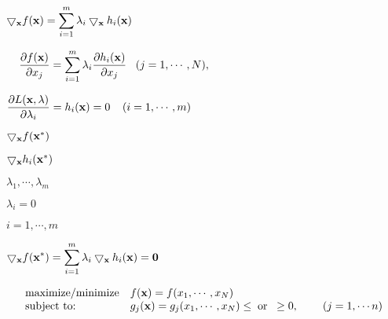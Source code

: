\documentclass{article}
\def\lthtmlcheckvsize{\ifdim\ht\sizebox<\vsize 
  \ifdim\wd\sizebox<\hsize\expandafter\hfill\fi \expandafter\vfill
  \else\expandafter\vss\fi}%
\begin{document}
{\newpage\clearpage
{}%
$\displaystyle \bigtriangledown_{\bf x} f({\bf x})
=\sum_{i=1}^m \lambda_i \bigtriangledown_{\bf x} h_i({\bf x})
\;\;\;\;$%
\lthtmlindisplaymathZ
\lthtmlcheckvsize\clearpage}

{\newpage\clearpage
{}%
$\displaystyle \;\;\;\;
\frac{\partial f({\bf x})}{\partial x_j}
=\sum_{i=1}^m\lambda_i \frac{\partial h_i({\bf x})}{\partial x_j}
\;\;\;(j=1,\cdots,N),$%
\lthtmlindisplaymathZ
\lthtmlcheckvsize\clearpage}

{\newpage\clearpage
{}%
$\displaystyle \frac{\partial L({\bf x},{\bf\lambda})}{\partial \lambda_i}
=h_i({\bf x})=0\;\;\;\;(i=1,\cdots,m)$%
\lthtmlindisplaymathZ
\lthtmlcheckvsize\clearpage}

{\newpage\clearpage
{}%
$ \bigtriangledown_{\bf x}f({\bf x}^*)$%
\lthtmlindisplaymathZ
\lthtmlcheckvsize\clearpage}

{\newpage\clearpage
{}%
$ \bigtriangledown_{\bf x} h_i({\bf x}^*)$%
\lthtmlindisplaymathZ
\lthtmlcheckvsize\clearpage}

{\newpage\clearpage
{}%
$ \lambda_1,\cdots,\lambda_m$%
\lthtmlindisplaymathZ
\lthtmlcheckvsize\clearpage}

{\newpage\clearpage
{}%
$ \lambda_i=0$%
\lthtmlindisplaymathZ
\lthtmlcheckvsize\clearpage}

{\newpage\clearpage
{}%
$ i=1,\cdots,m$%
\lthtmlindisplaymathZ
\lthtmlcheckvsize\clearpage}

{\newpage\clearpage
{}%
$\displaystyle \bigtriangledown_{\bf x} f({\bf x}^*)
=\sum_{i=1}^m \lambda_i \bigtriangledown_{\bf x} h_i({\bf x})={\bf0}$%
\lthtmlindisplaymathZ
\lthtmlcheckvsize\clearpage}

{\newpage\clearpage
{}%
\begin{displaymath}\begin{array}{ll}
\mbox{maximize/minimize} & f({\bf x})=f(x_1,\cdots,x_N) \\
\mbox{subject to:} &
g_j({\bf x})=g_j(x_1,\cdots,x_N)\le \;\mbox{or}\;\;
\ge 0,\;\;\;\;\;\;\;\;(j=1,\cdots n)
\end{array}\end{displaymath}%
\lthtmldisplayZ
\lthtmlcheckvsize\clearpage}
\end{document}
